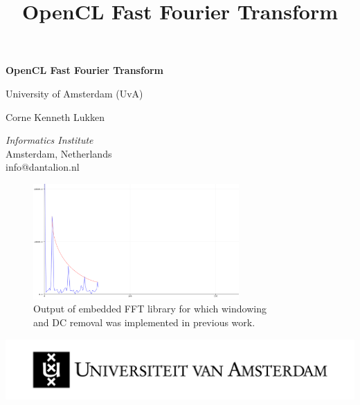 \documentclass[conference]{IEEEtran}
\title{OpenCL Fast Fourier Transform%
}
\begin{document}
\begin{titlepage}
\begingroup
\centering
{\LARGE\bfseries OpenCL Fast Fourier Transform}

\vspace{1cm}

{\Large University of Amsterdam (UvA)}

\vspace{0.5cm}

{Corne Kenneth Lukken}

{\textit{Informatics Institute} \\
Amsterdam, Netherlands \\
info@dantalion.nl}

\vspace{4.0cm}

\begin{figure}[H]
	\centering
	\includegraphics[width=0.7\textwidth]{resources/images/arduino-fft.png}
	\captionsetup{justification=centering}
	\caption{
		Output of embedded FFT library for which windowing \\
		and DC removal was implemented in previous work\cite{arduinofft}.
	}
\end{figure}

\vfill
\endgroup
\hfill
\begin{minipage}{0.3\textwidth}
\begin{flushright}
	\includegraphics[width=\textwidth]{resources/images/uva-logo.png}
\end{flushright}
\end{minipage}
\end{titlepage}

\clearpage
\onecolumn

\hypersetup{
	linkcolor=black
}
\end{document}
